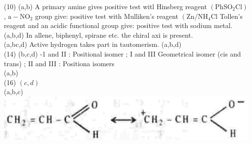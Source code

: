 \documentclass[10pt]{article}
\begin{document}
(10) (a,b) A primary amine gives positive test witl Hinsberg reagent $\left(\mathrm{PhSO}_{2} \mathrm{Cl}\right)$, $\mathrm{a}-\mathrm{NO}_{2}$ group give: positive test with Mulliken's reagent $\left(\mathrm{Zn} / \mathrm{NH}_{4} \mathrm{Cl}\right.$ Tollen's reagent and an acidic functional group give: positive test with sodium metal.\\
(a,b,d) In allene, biphenyl, spirane etc. the chiral axi is present.\\
(a,bc,d) Active hydrogen takes part in tautomerism. (a,b,d)\\
(14) (b,c,d) -1 and II : Positional isomer ; I and III Geometrical isomer (cis and trans) ; II and III : Positiona isomers\\
(a,b)\\
(16) $(c, d)$\\
(a,b,c)\\
\includegraphics[max width=\textwidth, center]{2025_01_28_8470952b98110cec3aabg-164}
\end{document}
